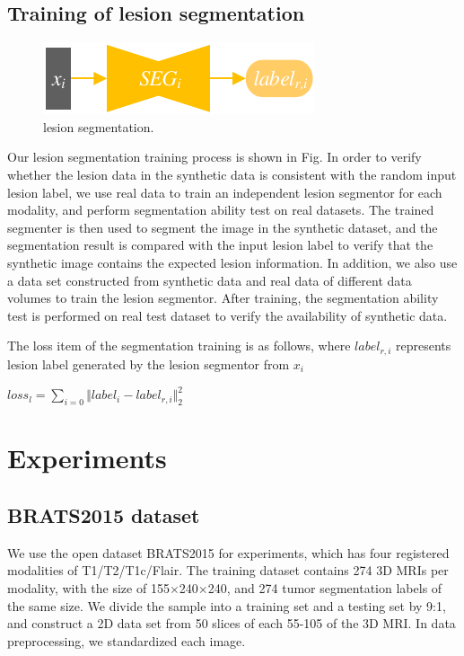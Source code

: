 \documentclass[letterpaper]{article} %
\begin{document}
\subsection{Training of lesion segmentation}
\begin{figure}
	\centering
	\includegraphics[width=0.45\columnwidth]{figures/segmentation}
	\caption{lesion segmentation.}
	\label{segmentation}
\end{figure}

Our lesion segmentation training process is shown in Fig. In order to verify whether the lesion data in the synthetic data is consistent with the random input lesion label, we use real data to train an independent lesion segmentor for each modality, and perform segmentation ability test on real datasets. The trained segmenter is then used to segment the image in the synthetic dataset, and the segmentation result is compared with the input lesion label to verify that the synthetic image contains the expected lesion information. In addition, we also use a data set constructed from synthetic data and real data of different data volumes to train the lesion segmentor. After training, the segmentation ability test is performed on real test dataset to verify the availability of  synthetic data.

The loss item of the segmentation training is as follows, where $label_{r,i}$ represents lesion label generated by the lesion segmentor from $x_i$
\begin{center}
		$loss_{l}=\sum\limits_{i=0}\Vert{label_i-label_{r,i}}\Vert_{2}^{2}$
\end{center}


\section{Experiments}

\subsection{BRATS2015 dataset}
We use the open dataset BRATS2015 for experiments, which has four registered modalities of T1/T2/T1c/Flair. The training dataset contains 274 3D MRIs per modality, with the size of 155$\times$240$\times$240, and 274 tumor segmentation labels of the same size. We divide the sample into a training set and a testing set by 9:1, and construct a 2D data set from 50 slices of each 55-105 of the 3D MRI. In data preprocessing, we standardized each image.
\end{document}
